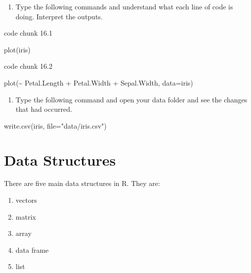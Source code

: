 \documentclass[
  letterpaper,
  DIV=11,
  numbers=noendperiod]{scrreprt}
\newenvironment{Shaded}{\begin{snugshade}}{\end{snugshade}}
\newcommand{\AttributeTok}[1]{\textcolor[rgb]{0.40,0.45,0.13}{#1}}
\newcommand{\FunctionTok}[1]{\textcolor[rgb]{0.28,0.35,0.67}{#1}}
\newcommand{\NormalTok}[1]{\textcolor[rgb]{0.00,0.23,0.31}{#1}}
\newcommand{\SpecialCharTok}[1]{\textcolor[rgb]{0.37,0.37,0.37}{#1}}
\newcommand{\StringTok}[1]{\textcolor[rgb]{0.13,0.47,0.30}{#1}}
\providecommand{\tightlist}{%
  \setlength{\itemsep}{0pt}\setlength{\parskip}{0pt}}\usepackage{longtable,booktabs,array}
\begin{document}
\begin{enumerate}
\def\labelenumi{\arabic{enumi}.}
\setcounter{enumi}{15}
\tightlist
\item
  Type the following commands and understand what each line of code is
  doing. Interpret the outputs.
\end{enumerate}

code chunk 16.1

\begin{Shaded}
\begin{Highlighting}[]
\FunctionTok{plot}\NormalTok{(iris)}
\end{Highlighting}
\end{Shaded}

code chunk 16.2

\begin{Shaded}
\begin{Highlighting}[]
\FunctionTok{plot}\NormalTok{(}\SpecialCharTok{\textasciitilde{}}\NormalTok{ Petal.Length }\SpecialCharTok{+}\NormalTok{ Petal.Width }\SpecialCharTok{+}\NormalTok{ Sepal.Width, }\AttributeTok{data=}\NormalTok{iris)}
\end{Highlighting}
\end{Shaded}

\begin{enumerate}
\def\labelenumi{\arabic{enumi}.}
\setcounter{enumi}{16}
\tightlist
\item
  Type the following command and open your data folder and see the
  changes that had occurred.
\end{enumerate}

\begin{Shaded}
\begin{Highlighting}[]
\FunctionTok{write.csv}\NormalTok{(iris, }\AttributeTok{file=}\StringTok{"data/iris.csv"}\NormalTok{)}
\end{Highlighting}
\end{Shaded}


\chapter{Data Structures}\label{data-structures}

There are five main data structures in R. They are:

\begin{enumerate}
\def\labelenumi{\arabic{enumi}.}
\item
  vectors
\item
  matrix
\item
  array
\item
  data frame
\item
  list
\end{enumerate}
\end{document}
